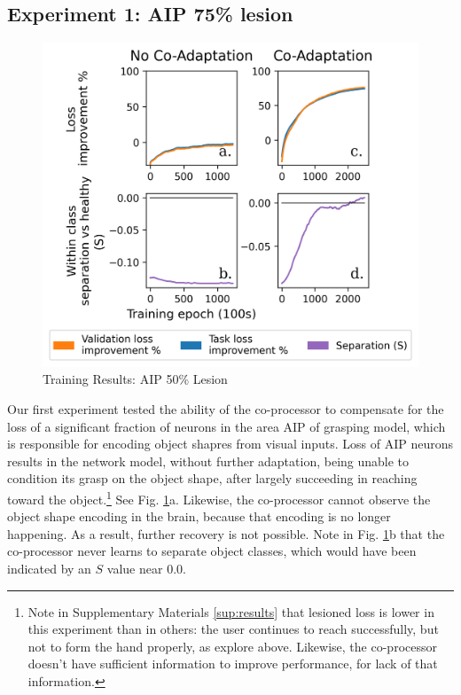 \documentclass[12pt]{iopart}
\begin{document}
\subsection{Experiment 1: AIP 75\% lesion}
\begin{figure}[h]
\centering
\includegraphics[scale=1.3]{training_results_aip.png}
\caption{Training Results: AIP 50\% Lesion}
\label{fig:results_aip}
\end{figure}

Our first experiment tested the ability of the co-processor to compensate for the loss of a significant
fraction of neurons in the area AIP of grasping model, which is responsible for encoding object shapres
from visual inputs. Loss of AIP neurons results in the network model, without further adaptation, being unable to
condition its grasp on the object shape, after largely succeeding in reaching toward the object.\footnote{Note
in Supplementary Materials \ref{sup:results} that lesioned loss is lower in this experiment than
in others: the user continues to reach successfully, but not to form the hand properly, as
explore above. Likewise, the co-processor doesn't have sufficient information to improve
performance, for lack of that information.} See Fig. \ref{fig:results_aip}a. Likewise, the co-processor cannot
observe the object shape encoding in the brain, because that encoding is no longer happening. As a result,
further recovery is not possible. Note in Fig. \ref{fig:results_aip}b that the co-processor never learns to
separate object classes, which would have been indicated by an $S$ value near $0.0$.
\end{document}

